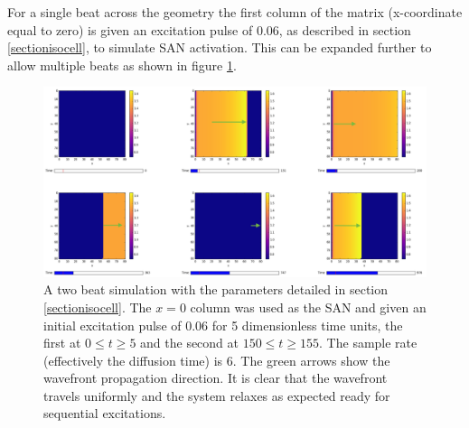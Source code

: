 For a single beat across the geometry the first column of the matrix (x-coordinate equal to zero) is given an excitation pulse of 0.06, as described in section \ref{sectionisocell}, to simulate SAN activation. This can be expanded further to allow multiple beats as shown in figure \ref{fig5.3a}. \par
\begin{figure}[H]
    \centering
    \includegraphics[width=\textwidth]{images/2beatimage.png}
    \caption{A two beat simulation with the parameters detailed in section \ref{sectionisocell}. The $x=0$ column was used as the SAN and given an initial excitation pulse of 0.06 for 5 dimensionless time units, the first at $0\leq t \geq 5$ and the second at $150 \leq t \geq 155$. The sample rate (effectively the diffusion time) is 6. The green arrows show the wavefront propagation direction. It is clear that the wavefront travels uniformly and the system relaxes as expected ready for sequential excitations.}
    \label{fig5.3a}
\end{figure}

